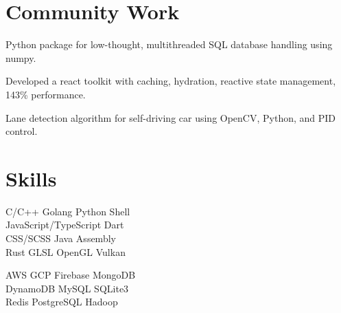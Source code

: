 \documentclass[]{deedy-resume-openfont}
\begin{document}
\begin{minipage}[t]{0.31\textwidth}

\section{Community Work}
 
Python package for low-thought, multithreaded SQL database handling using numpy.

\vspace{\topsep}

 
Developed a react toolkit with caching, hydration, reactive state management, 143\% performance.
\sectionsep

\vspace{\topsep}

 
Lane detection algorithm for self-driving car using OpenCV, Python, and PID control.
\sectionsep


\section{Skills}

C/C++ \textbullet{}
Golang \textbullet{}
Python \textbullet{}
Shell \\ 
JavaScript/TypeScript \textbullet{}
Dart \\
CSS/SCSS \textbullet{}
Java \textbullet{}
Assembly \\
Rust \textbullet{}
GLSL \textbullet{}
OpenGL \textbullet{}
Vulkan \\

\vspace{6pt}

AWS \textbullet{}
GCP \textbullet{}
Firebase \textbullet{}
MongoDB \\
DynamoDB \textbullet{}
MySQL \textbullet{}
SQLite3 \\
Redis \textbullet{}
PostgreSQL \textbullet{}
Hadoop \\


\end{minipage}
\end{document}
